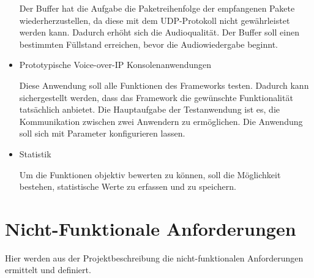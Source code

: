 \begin{itemize}
		Der Buffer hat die Aufgabe die Paketreihenfolge der empfangenen Pakete wiederherzustellen, da diese mit dem UDP-Protokoll nicht gewährleistet werden kann. Dadurch erhöht sich die Audioqualität. Der Buffer soll einen bestimmten Füllstand erreichen, bevor die Audiowiedergabe beginnt.
				
		\item Prototypische Voice-over-IP Konsolenanwendungen

		Diese Anwendung soll alle Funktionen des Frameworks testen. Dadurch kann sichergestellt werden, dass das Framework die gewünschte Funktionalität tatsächlich anbietet. Die Hauptaufgabe der Testanwendung ist es, die Kommunikation zwischen zwei Anwendern zu ermöglichen. Die Anwendung soll sich mit Parameter konfigurieren lassen. 
				
		\item Statistik

		Um die Funktionen objektiv bewerten zu können, soll die Möglichkeit bestehen, statistische Werte zu erfassen und zu speichern.
		
	\end{itemize}
	
\section{Nicht-Funktionale Anforderungen}
Hier werden aus der Projektbeschreibung die nicht-funktionalen Anforderungen ermittelt und definiert.

